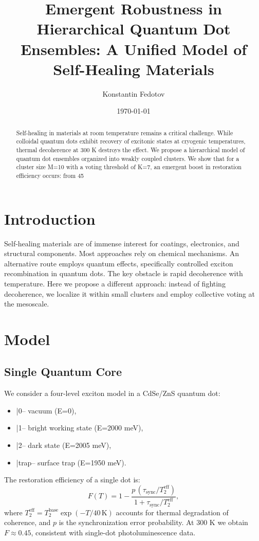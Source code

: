 \documentclass[12pt]{article}
\title{Emergent Robustness in Hierarchical Quantum Dot Ensembles: A Unified Model of Self-Healing Materials}
\author{Konstantin Fedotov}
\date{\today}
\begin{document}
\maketitle

\begin{abstract}
Self-healing in materials at room temperature remains a critical challenge. While colloidal quantum dots exhibit recovery of excitonic states at cryogenic temperatures, thermal decoherence at 300 K destroys the effect. We propose a hierarchical model of quantum dot ensembles organized into weakly coupled clusters. We show that for a cluster size M=10 with a voting threshold of K=7, an emergent boost in restoration efficiency occurs: from 45%
\end{abstract}

\section{Introduction}
Self-healing materials are of immense interest for coatings, electronics, and structural components. Most approaches rely on chemical mechanisms. An alternative route employs quantum effects, specifically controlled exciton recombination in quantum dots. The key obstacle is rapid decoherence with temperature. Here we propose a different approach: instead of fighting decoherence, we localize it within small clusters and employ collective voting at the mesoscale.

\section{Model}
\subsection{Single Quantum Core}
We consider a four-level exciton model in a CdSe/ZnS quantum dot:
\begin{itemize}
    \item |0\rangle -- vacuum (E=0),
    \item |1\rangle -- bright working state (E=2000 meV),
    \item |2\rangle -- dark state (E=2005 meV),
    \item |trap\rangle -- surface trap (E=1950 meV).
\end{itemize}
The restoration efficiency of a single dot is:
\begin{equation}
F(T) = 1 - \frac{p \, (\tau_{\text{sync}}/T_2^{\text{eff}})}{1 + \tau_{\text{sync}}/T_2^{\text{eff}}},
\end{equation}
where $T_2^{\text{eff}} = T_2^{\text{base}} \exp(-T/40\,\text{K})$ accounts for thermal degradation of coherence, and $p$ is the synchronization error probability. At 300 K we obtain $F \approx 0.45$, consistent with single-dot photoluminescence data.
\end{document}
